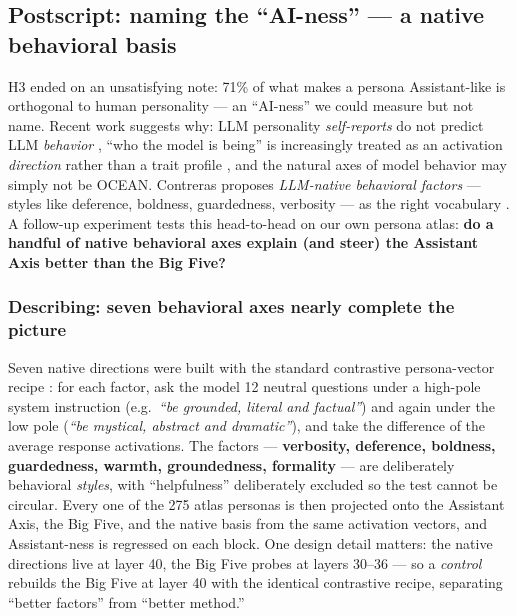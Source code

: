 \documentclass[11pt]{article}
\begin{document}
\subsection{Postscript: naming the ``AI-ness'' --- a native behavioral
basis}\label{sec:native}

H3 ended on an unsatisfying note: 71\% of what makes a persona Assistant-like
is orthogonal to human personality --- an ``AI-ness'' we could measure but not
name. Recent work suggests why: LLM personality \emph{self-reports} do not
predict LLM \emph{behavior} \citep{contreras,illusion}, ``who the model is
being'' is increasingly treated as an activation \emph{direction} rather than
a trait profile \citep{personavectors,emergentmisalign}, and the natural axes
of model behavior may simply not be OCEAN. Contreras proposes \emph{LLM-native
behavioral factors} --- styles like deference, boldness, guardedness,
verbosity --- as the right vocabulary \citep{contreras}. A follow-up
experiment tests this head-to-head on our own persona atlas: \textbf{do a
handful of native behavioral axes explain (and steer) the Assistant Axis
better than the Big Five?}

\subsubsection{Describing: seven behavioral axes nearly complete the picture}

Seven native directions were built with the standard contrastive
persona-vector recipe \citep{personavectors,caa}: for each factor, ask the
model 12 neutral questions under a high-pole system instruction (e.g.\
\emph{``be grounded, literal and factual''}) and again under the low pole
(\emph{``be mystical, abstract and dramatic''}), and take the difference of
the average response activations. The factors --- \textbf{verbosity,
deference, boldness, guardedness, warmth, groundedness, formality} ---
are deliberately behavioral \emph{styles}, with ``helpfulness'' deliberately
excluded so the test cannot be circular. Every one of the 275 atlas personas
is then projected onto the Assistant Axis, the Big Five, and the native basis
from the same activation vectors, and Assistant-ness is regressed on each
block. One design detail matters: the native directions live at layer 40, the
Big Five probes at layers 30--36 --- so a \emph{control} rebuilds the Big Five
at layer 40 with the identical contrastive recipe, separating ``better
factors'' from ``better method.''
\end{document}
